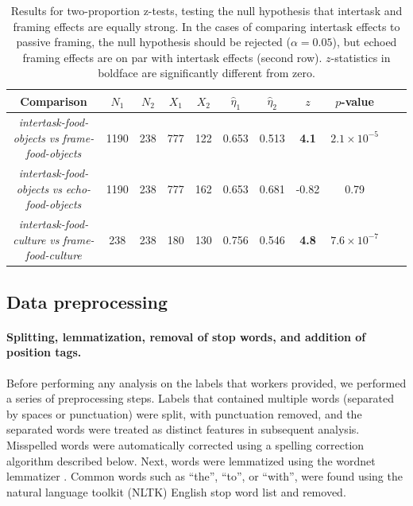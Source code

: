 \documentclass[12pt]{article}
\begin{document}
\begin{table}
\begin{center}
\begin{tabular}{c c c c c c c c c c c }
	\toprule
	Comparison & $N_1$ & $N_2$ & $X_1$ & $X_2$ & $\hat{\eta}_1$ 
		& $\hat{\eta}_2$ & $z$ & $p$-value \\ 
	\midrule
	\parbox[c]{4cm}{\textit{intertask-food-objects} 
	\textit{vs} \textit{frame-food-objects}} & 1190 & 238 & 777 & 122 &
	0.653 & 0.513 & \textbf{4.1} & $2.1 \times 10^{-5}$ \\ 

\noalign{\smallskip}
\hdashline
\noalign{\smallskip}

	\parbox[c]{4cm}{\textit{intertask-food-objects} 
	\textit{vs} \textit{echo-food-objects}} & 1190 & 238 & 777 & 162 
		& 0.653 & 0.681 & -0.82 & 0.79 \\

\noalign{\smallskip}
\hdashline
\noalign{\smallskip}

	\parbox[c]{4cm}{\textit{intertask-food-culture} 
	\textit{vs} \textit{frame-food-culture}} & 238 & 238 & 180 & 130 
	& 0.756 & 0.546 & \textbf{4.8} & $7.6 \times 10^{-7}$ \\
	\bottomrule

\end{tabular}

\caption{
	Results for two-proportion z-tests, testing the null hypothesis that 
	intertask and framing effects are equally strong.
	In the cases of comparing intertask effects to passive framing, the
	null hypothesis should be rejected ($\alpha=0.05$), but 
	echoed framing effects are on par with intertask effects (second row). 
	$z$-statistics in boldface are significantly different from zero.
}
\label{table:intertask_framing}
\end{center}
\end{table}




\subsection*{Data preprocessing}
	\paragraph{Splitting, lemmatization, removal of stop words, and 
		addition of position tags.} 

	Before performing any analysis on the labels that workers provided, we
	performed a series of preprocessing steps.  
	Labels that contained
	multiple words (separated by spaces or punctuation) were split, with
	punctuation removed, and the separated words were treated as distinct 
	features in subsequent analysis.
	Misspelled words were automatically corrected using a spelling 
	correction algorithm described below.  
	Next, words were lemmatized using the
	wordnet lemmatizer \cite{felbaum1998wordnet}.  %
	Common words such as ``the'', ``to'', or ``with'', were found using
	the natural language toolkit (NLTK) English stop word list 
	\cite{loper2002nltk} and removed.
\end{document}

